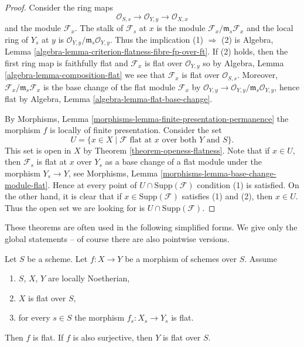 \begin{proof}
Consider the ring maps
$$
\mathcal{O}_{S, s} \longrightarrow
\mathcal{O}_{Y, y} \longrightarrow \mathcal{O}_{X, x}
$$
and the module $\mathcal{F}_x$. The stalk of $\mathcal{F}_s$ at $x$
is the module $\mathcal{F}_x/\mathfrak m_s \mathcal{F}_x$ and
the local ring of $Y_s$ at $y$ is
$\mathcal{O}_{Y, y}/\mathfrak m_s \mathcal{O}_{Y, y}$.
Thus the implication (1) $\Rightarrow$ (2) is
Algebra, Lemma \ref{algebra-lemma-criterion-flatness-fibre-fp-over-ft}.
If (2) holds, then the first ring map is faithfully flat
and $\mathcal{F}_x$ is flat over $\mathcal{O}_{Y, y}$ so by
Algebra, Lemma \ref{algebra-lemma-composition-flat}
we see that $\mathcal{F}_x$ is flat over $\mathcal{O}_{S, s}$.
Moreover, $\mathcal{F}_x/\mathfrak m_s \mathcal{F}_x$ is the
base change of the flat module $\mathcal{F}_x$ by
$\mathcal{O}_{Y, y} \to \mathcal{O}_{Y, y}/\mathfrak m_s \mathcal{O}_{Y, y}$,
hence flat by
Algebra, Lemma \ref{algebra-lemma-flat-base-change}.

\medskip\noindent
By
Morphisms, Lemma \ref{morphisms-lemma-finite-presentation-permanence}
the morphism $f$ is locally of finite presentation.
Consider the set
\begin{equation}
\label{equation-open}
U = \{x \in X \mid \mathcal{F} \text{ flat at }x
\text{ over both }Y\text{ and }S\}.
\end{equation}
This set is open in $X$ by
Theorem \ref{theorem-openess-flatness}.
Note that if $x \in U$, then $\mathcal{F}_s$ is flat at
$x$ over $Y_s$ as a base change of a flat module under the
morphism $Y_s \to Y$, see
Morphisms, Lemma \ref{morphisms-lemma-base-change-module-flat}.
Hence at every point of $U \cap \text{Supp}(\mathcal{F})$
condition (1) is satisfied. On the other hand, it is
clear that if $x \in \text{Supp}(\mathcal{F})$ satisfies
(1) and (2), then $x \in U$. Thus the open set we are
looking for is $U \cap \text{Supp}(\mathcal{F})$.
\end{proof}

\noindent
These theorems are often used in the following simplified forms.
We give only the global statements -- of course there are also pointwise
versions.

\begin{lemma}
\label{lemma-morphism-between-flat-Noetherian}
Let $S$ be a scheme.
Let $f : X \to Y$ be a morphism of schemes over $S$.
Assume
\begin{enumerate}
\item $S$, $X$, $Y$ are locally Noetherian,
\item $X$ is flat over $S$,
\item for every $s \in S$ the morphism
$f_s : X_s \to Y_s$ is flat.
\end{enumerate}
Then $f$ is flat. If $f$ is also surjective, then $Y$ is flat over $S$.
\end{lemma}

